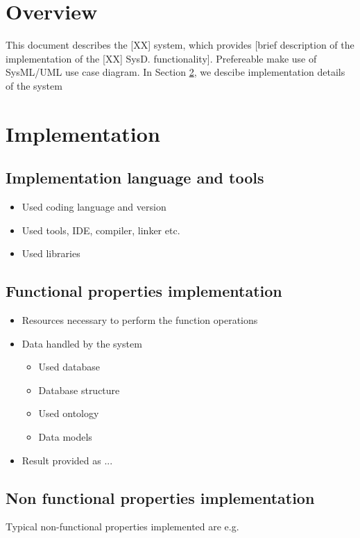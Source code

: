 \documentclass[a4paper]{arrowhead}
\begin{document}
\section{Overview}
\label{sec:overview}
\color{red}
This document describes the [XX] system, which provides [brief
description of the implementation of the [XX] SysD.
functionality]. Prefereable make use of SysML/UML 
use case diagram. 
\color{black}
In Section \ref{Implementation}, we descibe implementation details of
the system



\newpage

\section{Implementation}
\label{Implementation}

\subsection {Implementation language and tools}
\color{red}
\begin{itemize}
\item Used coding language and version
\item Used tools, IDE, compiler, linker etc.
\item Used libraries
\end{itemize} 
\color{black}

\subsection {Functional properties implementation}
\color{red}
  \begin{itemize}
  \item Resources necessary to perform the function operations
  \item Data handled by the system
    \begin{itemize}
    \item Used database
    \item Database structure
    \item Used ontology
    \item Data models
    \end{itemize}
  \item Result provided as ...
  \end{itemize}
\color{black}

\subsection {Non functional properties implementation}
\color{red}
Typical non-functional properties implemented are e.g.
\end{document}
